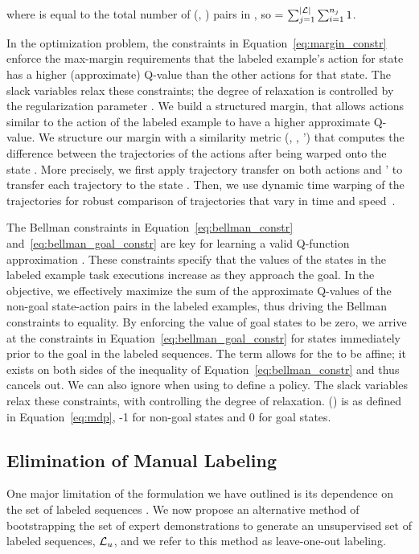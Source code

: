 where  is equal to the total number of
(\statevar{}, \actionvar{}) pairs in , so  = 
$\sum_{j=1}^{|\mathcal{L}|{}} \sum_{i=1}^{n_{j}} 1$.

In the optimization problem, the constraints in Equation~\ref{eq:margin_constr}
enforce the max-margin requirements that the
labeled example's action  for state 
has a higher (approximate) Q-value than the other actions for that
state. The slack variables  relax these constraints;
the degree of relaxation is controlled by the regularization parameter \marginslackc{}.
We build a structured margin, that allows actions similar to the
action of the labeled example to have a higher approximate Q-value.
We structure our margin with a similarity metric
\marginvar{}(, , \actionvar{}') that computes
the difference between the trajectories of the actions after being warped onto
the state . More precisely, we first apply trajectory
transfer on both actions  and \actionvar{}' to transfer
each trajectory to the state . Then, we use dynamic
time warping of the trajectories for robust comparison of trajectories that
vary in time and speed~\cite{Sakoe_IEEE1978, Vakanski_2012}.

The Bellman constraints in Equation~\ref{eq:bellman_constr} and~\ref{eq:bellman_goal_constr}
are key for learning a valid Q-function approximation \approxq. These constraints specify that
the values of the states in the labeled example task executions increase as they
approach the goal. In the objective, we effectively maximize the sum of the
approximate Q-values of the non-goal state-action pairs in the labeled examples,
thus driving the Bellman constraints to equality. By enforcing the value of goal states
to be zero, we arrive at the constraints in Equation~\ref{eq:bellman_goal_constr} for
states immediately prior to the goal in the labeled sequences.
The \weightszero{} term allows for the \approxq{} to be affine; it exists on
both sides of the inequality of Equation~\ref{eq:bellman_constr} and thus cancels out.
We can also ignore \weightszero{} when using \approxq{} to define a policy. The slack variables
 relax these constraints, with \bellmanslackc{} controlling
the degree of relaxation.
\rewardfn{}(\statevar{}) is as defined in Equation~\ref{eq:mdp},
-1 for non-goal states and 0 for goal states.

\subsection{Elimination of Manual Labeling}
\label{subsec:lool}
One major limitation of the formulation we have outlined is its dependence on
the set of labeled sequences . We now propose an alternative method
of bootstrapping the set of expert demonstrations \demoset{} to generate an
unsupervised set of labeled sequences, $\mathcal{L}{}_u$, and we refer to this
method as leave-one-out labeling.

